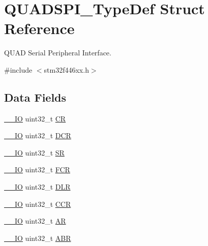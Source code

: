 \hypertarget{struct_q_u_a_d_s_p_i___type_def}{}\section{Q\+U\+A\+D\+S\+P\+I\+\_\+\+Type\+Def Struct Reference}
\label{struct_q_u_a_d_s_p_i___type_def}


Q\+U\+AD Serial Peripheral Interface.  




{\ttfamily \#include $<$stm32f446xx.\+h$>$}

\subsection*{Data Fields}
\begin{DoxyCompactItemize}
\item 
\hyperlink{core__sc300_8h_aec43007d9998a0a0e01faede4133d6be}{\+\_\+\+\_\+\+IO} uint32\+\_\+t \hyperlink{struct_q_u_a_d_s_p_i___type_def_ab40c89c59391aaa9d9a8ec011dd0907a}{CR}
\item 
\hyperlink{core__sc300_8h_aec43007d9998a0a0e01faede4133d6be}{\+\_\+\+\_\+\+IO} uint32\+\_\+t \hyperlink{struct_q_u_a_d_s_p_i___type_def_af6225cb8f4938f98204d11afaffd41c9}{D\+CR}
\item 
\hyperlink{core__sc300_8h_aec43007d9998a0a0e01faede4133d6be}{\+\_\+\+\_\+\+IO} uint32\+\_\+t \hyperlink{struct_q_u_a_d_s_p_i___type_def_af6aca2bbd40c0fb6df7c3aebe224a360}{SR}
\item 
\hyperlink{core__sc300_8h_aec43007d9998a0a0e01faede4133d6be}{\+\_\+\+\_\+\+IO} uint32\+\_\+t \hyperlink{struct_q_u_a_d_s_p_i___type_def_a5d5cc7f32884945503dd29f8f6cbb415}{F\+CR}
\item 
\hyperlink{core__sc300_8h_aec43007d9998a0a0e01faede4133d6be}{\+\_\+\+\_\+\+IO} uint32\+\_\+t \hyperlink{struct_q_u_a_d_s_p_i___type_def_a651b3980342dcf21d301d29621dcf4f6}{D\+LR}
\item 
\hyperlink{core__sc300_8h_aec43007d9998a0a0e01faede4133d6be}{\+\_\+\+\_\+\+IO} uint32\+\_\+t \hyperlink{struct_q_u_a_d_s_p_i___type_def_a5e1322e27c40bf91d172f9673f205c97}{C\+CR}
\item 
\hyperlink{core__sc300_8h_aec43007d9998a0a0e01faede4133d6be}{\+\_\+\+\_\+\+IO} uint32\+\_\+t \hyperlink{struct_q_u_a_d_s_p_i___type_def_a2ac50357d1ebac2949d27bfc4855e6a4}{AR}
\item 
\hyperlink{core__sc300_8h_aec43007d9998a0a0e01faede4133d6be}{\+\_\+\+\_\+\+IO} uint32\+\_\+t \hyperlink{struct_q_u_a_d_s_p_i___type_def_a53d4126533b52183ef8105af2e526bd0}{A\+BR}

\end{DoxyCompactItemize}
